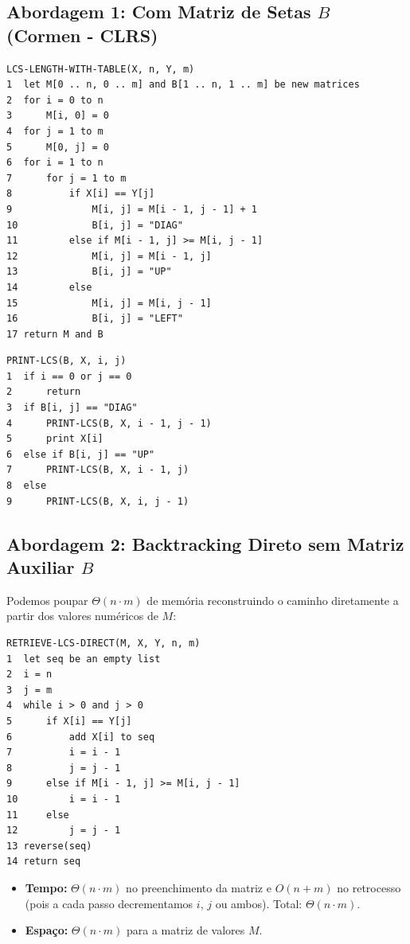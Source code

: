 \documentclass[11pt,a4paper]{article}
\begin{document}
\subsection*{Abordagem 1: Com Matriz de Setas $B$ (Cormen - CLRS)}

\begin{lstlisting}[caption={Preenchimento com Matriz de Rota $B$}]
LCS-LENGTH-WITH-TABLE(X, n, Y, m)
1  let M[0 .. n, 0 .. m] and B[1 .. n, 1 .. m] be new matrices
2  for i = 0 to n
3      M[i, 0] = 0
4  for j = 1 to m
5      M[0, j] = 0
6  for i = 1 to n
7      for j = 1 to m
8          if X[i] == Y[j]
9              M[i, j] = M[i - 1, j - 1] + 1
10             B[i, j] = "DIAG"
11         else if M[i - 1, j] >= M[i, j - 1]
12             M[i, j] = M[i - 1, j]
13             B[i, j] = "UP"
14         else
15             M[i, j] = M[i, j - 1]
16             B[i, j] = "LEFT"
17 return M and B
\end{lstlisting}

\begin{lstlisting}[caption={Impressão Recursiva da Cadeia de Caracteres}]
PRINT-LCS(B, X, i, j)
1  if i == 0 or j == 0
2      return
3  if B[i, j] == "DIAG"
4      PRINT-LCS(B, X, i - 1, j - 1)
5      print X[i]
6  else if B[i, j] == "UP"
7      PRINT-LCS(B, X, i - 1, j)
8  else
9      PRINT-LCS(B, X, i, j - 1)
\end{lstlisting}

\subsection*{Abordagem 2: Backtracking Direto sem Matriz Auxiliar $B$}
Podemos poupar $\Theta(n \cdot m)$ de memória reconstruindo o caminho diretamente a partir dos valores numéricos de $M$:

\begin{lstlisting}[caption={Reconstrução Iterativa Direta (Economia de Memória)}]
RETRIEVE-LCS-DIRECT(M, X, Y, n, m)
1  let seq be an empty list
2  i = n
3  j = m
4  while i > 0 and j > 0
5      if X[i] == Y[j]
6          add X[i] to seq
7          i = i - 1
8          j = j - 1
9      else if M[i - 1, j] >= M[i, j - 1]
10         i = i - 1
11     else
12         j = j - 1
13 reverse(seq)
14 return seq
\end{lstlisting}

\begin{dica}
\begin{itemize}
    \item \textbf{Tempo:} $\Theta(n \cdot m)$ no preenchimento da matriz e $O(n + m)$ no retrocesso (pois a cada passo decrementamos $i$, $j$ ou ambos). Total: $\Theta(n \cdot m)$.
    \item \textbf{Espaço:} $\Theta(n \cdot m)$ para a matriz de valores $M$.
\end{itemize}
\end{dica}
\end{document}
